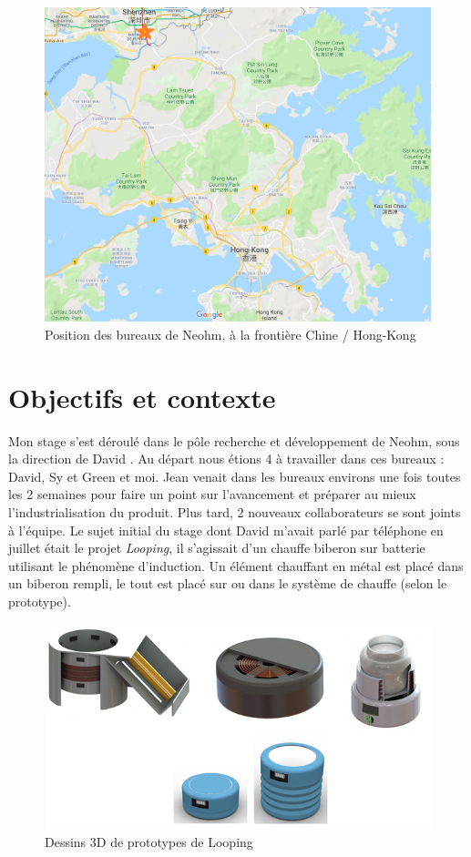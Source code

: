 \documentclass[a4paper, 12pt, sffamily]{report}
\begin{document}
\begin{figure}
\centering
\includegraphics[scale=0.4]{figures/screenshots/screen_maps.png}
\caption{Position des bureaux de Neohm, à la frontière Chine / Hong-Kong}
\label{fig:screen_maps}
\end{figure}

\chapter{Objectifs et contexte}
Mon stage s’est déroulé dans le pôle recherche et développement de Neohm, sous la direction de David . Au départ nous étions 4 à travailler dans ces bureaux : David, Sy et Green et moi. Jean venait dans les bureaux environs une fois toutes les 2 semaines pour faire un point sur l'avancement et préparer au mieux l'industrialisation du produit. Plus tard, 2 nouveaux collaborateurs se sont joints à l’équipe.
Le sujet initial du stage dont David m’avait parlé par téléphone en juillet était le projet \emph{Looping}, il s’agissait d’un chauffe biberon sur batterie utilisant le phénomène d’induction. Un élément chauffant en métal est placé dans un biberon rempli, le tout est placé sur ou dans le système de chauffe (selon le prototype).

\begin{figure}[H]
\centering
\includegraphics[scale=0.75]{figures/screenshots/3D_drawing_looping.png}
\caption{Dessins 3D de prototypes de Looping}
\label{fig:3D_looping}
\end{figure}
\end{document}
